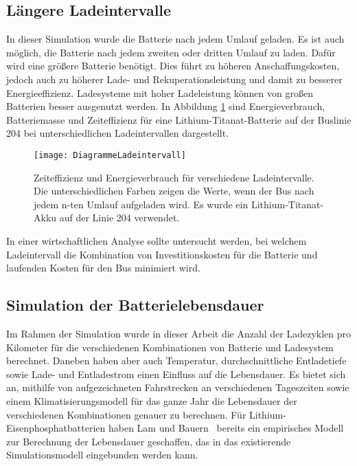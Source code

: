 \subsection{Längere Ladeintervalle} In dieser Simulation wurde die Batterie nach jedem Umlauf geladen. Es ist auch möglich, die Batterie nach jedem zweiten oder dritten Umlauf zu laden. Dafür wird eine größere Batterie benötigt. Dies führt zu höheren Anschaffungskosten, jedoch auch zu höherer Lade- und Rekuperationsleistung und damit zu besserer Energieeffizienz. Ladesysteme mit hoher Ladeleistung können von großen Batterien besser ausgenutzt werden. In Abbildung \ref{abb_DiagrammLadeintervalle} sind Energieverbrauch, Batteriemasse und Zeiteffizienz für eine Lithium-Titanat-Batterie auf der Buslinie 204 bei unterschiedlichen Ladeintervallen dargestellt.

\begin{figure}\centering
	\texttt{[image: DiagrammeLadeintervall]}
	\caption[Zeiteffizienz und Energieverbrauch für verschiedene Ladeintervalle]{Zeiteffizienz und Energieverbrauch für verschiedene Ladeintervalle. Die unterschiedlichen Farben zeigen die Werte, wenn der Bus nach jedem n-ten Umlauf aufgeladen wird. Es wurde ein Lithium-Titanat-Akku auf der Linie 204 verwendet.}
	\label{abb_DiagrammLadeintervalle}
\end{figure}

In einer wirtschaftlichen Analyse sollte untersucht werden, bei welchem Ladeintervall die Kombination von Investitionskosten für die Batterie und laufenden Kosten für den Bus minimiert wird. 

\subsection{Simulation der Batterielebensdauer}
Im Rahmen der Simulation wurde in dieser Arbeit die Anzahl der Ladezyklen pro Kilometer für die verschiedenen Kombinationen von Batterie und Ladesystem berechnet. Daneben haben aber auch Temperatur, durchschnittliche Entladetiefe sowie Lade- und Entladestrom einen Einfluss auf die Lebensdauer. Es bietet sich an, mithilfe von aufgezeichneten Fahrstrecken an verschiedenen Tageszeiten sowie einem Klimatisierungsmodell für das ganze Jahr die Lebensdauer der verschiedenen Kombinationen genauer zu berechnen. Für Lithium-Eisenphosphatbatterien haben Lam und Bauern~\cite{lam2013practical} bereits ein empirisches Modell zur Berechnung der Lebensdauer geschaffen, das in das existierende Simulationsmodell eingebunden werden kann.

